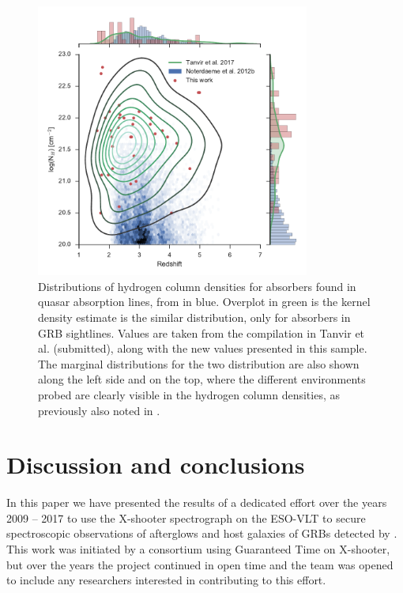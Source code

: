 \documentclass{aa}    %
\begin{document}
\begin{figure}[!ht]
	\centering \includegraphics[width=9cm]{figures/NH_dist.pdf}
\caption{Distributions of hydrogen column densities for absorbers found in
	quasar absorption lines, from \citep{Noterdaeme2012b} in blue. Overplot in
	green is the kernel density estimate is the similar distribution, only for
	absorbers in GRB sightlines. Values are taken from the compilation in Tanvir et
	al. (submitted), along with the new values presented in this sample. The
	marginal distributions for the two distribution are also shown along the left
	side and on the top, where the different environments probed are clearly
	visible in the hydrogen column densities, as previously also noted in
	\citet{Fynbo2009}.} \label{fig:NH_dist}
\end{figure}



\section{Discussion and conclusions}\label{conclusions}

In this paper we have presented the results of a dedicated effort over the years
2009 -- 2017 to use the X-shooter spectrograph on the ESO-VLT to secure
spectroscopic observations of afterglows and host galaxies of GRBs detected by
\swift. This work was initiated by a consortium using Guaranteed Time on
X-shooter, but over the years the project continued in open time and the team
was opened to include any researchers interested in contributing to this effort.
\end{document}
